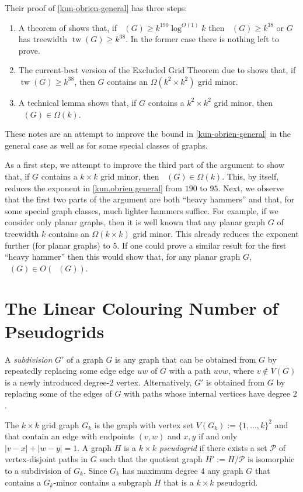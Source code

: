 \documentclass{patmorin}
\DeclareMathOperator{\tw}{tw}
\DeclareMathOperator{\chicen}{\chi_{\mathrm{cen}}}
\DeclareMathOperator{\chilin}{\chi_{\mathrm{lin}}}
\begin{document}
  
Their proof of \cref{kun-obrien-general} has three steps:
\begin{enumerate}
  \item A theorem of \citet{kawarabayashi.rossman:polynomial} shows that, if $\chicen(G)\ge k^{190}\log^{O(1)} k$ then $\chilin(G)\ge k^{38}$ or $G$ has treewidth $\tw(G)\ge k^{38}$.  In the former case there is nothing left to prove.
  \item The current-best version of the Excluded Grid Theorem due to \citet{chuzhoy:improved} shows that, if $\tw(G)\ge k^{38}$, then $G$ contains an $\Omega(k^2\times k^2)$ grid minor.
  \item A technical lemma \cite[Lemma~5]{kun.obrien.ea:polynomial} shows that, if $G$ contains a $k^2\times k^2$ grid minor, then $\chilin(G)\in\Omega(k)$.
\end{enumerate}

These notes are an attempt to improve the bound in \cref{kun-obrien-general} in the general case as well as for some special classes of graphs.  

As a first step, we attempt to improve the third part of the argument to show that, if $G$ contains a $k\times k$ grid minor, then $\chilin(G)\in \Omega(k)$.  This, by itself, reduces the exponent in \cref{kun.obrien.general} from $190$ to $95$.  Next, we observe that the first two parts of the argument are both ``heavy hammers'' and that, for some special graph classes, much lighter hammers suffice.  For example, if we consider only planar graphs, then it is well known that any planar graph $G$ of treewidth $k$ contains an $\Omega(k\times k)$ grid minor.  This already reduces the exponent further (for planar graphs) to $5$.  If one could prove a similar result for the first ``heavy hammer'' then this would show that, for any planar graph $G$, $\chicen(G)\in O(\chilin(G))$.

\section{The Linear Colouring Number of Pseudogrids}

A \emph{subdivision} $G'$ of a graph $G$ is any graph that can be obtained from $G$ by repeatedly replacing some edge edge $uw$ of $G$ with a path $uvw$, where $v\not\in V(G)$ is a newly introduced degree-$2$ vertex.  Alternatively, $G'$ is obtained from $G$ by replacing some of the edges of $G$ with paths whose internal vertices have degree $2$.

The $k\times k$ grid graph $G_k$ is the graph with vertex set $V(G_k):=\{1,\ldots,k\}^2$ and that contain an edge with endpoints $(v,w)$ and $x,y$ if and only $|v-x|+|w-y|=1$.  A graph $H$ is a $k\times k$ \emph{pseudogrid} if there exists a set $\mathcal{P}$ of vertex-disjoint paths in $G$ such that the quotient graph $H':=H/\mathcal{P}$ is isomorphic to a subdivision of $G_k$.  Since $G_k$ has maximum degree $4$ any graph $G$ that contains a $G_k$-minor contains a subgraph $H$ that is a $k\times k$ pseudogrid.
\end{document}
